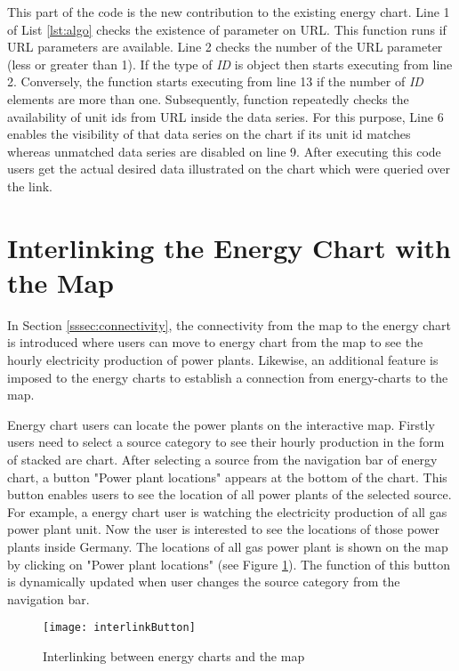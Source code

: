 This part of the code is the new contribution to the existing energy chart. Line 1 of List \ref{lst:algo} checks the existence of parameter on URL. This function runs if URL parameters are available. Line 2 checks the number of the URL parameter (less or greater than 1). If the type of \textit{ID} is object then starts executing from line 2. Conversely, the function starts executing from line 13 if the number of \textit{ID} elements are more than one. Subsequently, function repeatedly checks the availability of unit ids from URL inside the data series. For this purpose, Line 6 enables the visibility of that data series on the chart if its unit id matches whereas unmatched data series are disabled on line 9. After executing this code users get the actual desired data illustrated on the chart which were queried over the link.

\section{Interlinking the Energy Chart with the Map}

In Section \ref{sssec:connectivity}, the connectivity from the map to the energy chart is introduced where users can move to energy chart from the map to see the hourly electricity production of power plants. Likewise, an additional feature is imposed to the energy charts to establish a connection from energy-charts to the map. 

Energy chart users can locate the power plants on the interactive map. Firstly users need to select a source category to see their hourly production in the form of stacked are chart. After selecting a source from the navigation bar of energy chart, a button "Power plant locations" appears at the bottom of the chart. This button enables users to see the location of all power plants of the selected source. For example, a energy chart user is watching the electricity production of all gas power plant unit. Now the user is interested to see the locations of those power plants inside Germany. The locations of all gas power plant is shown on the map by clicking on "Power plant locations" (see Figure \ref{fig:interlink}). The function of this button is dynamically updated when user changes the source category from the navigation bar. 

\begin{figure}
\centering
\texttt{[image: interlinkButton]}
\caption{Interlinking between energy charts and the map}
\label{fig:interlink}
\end{figure}

